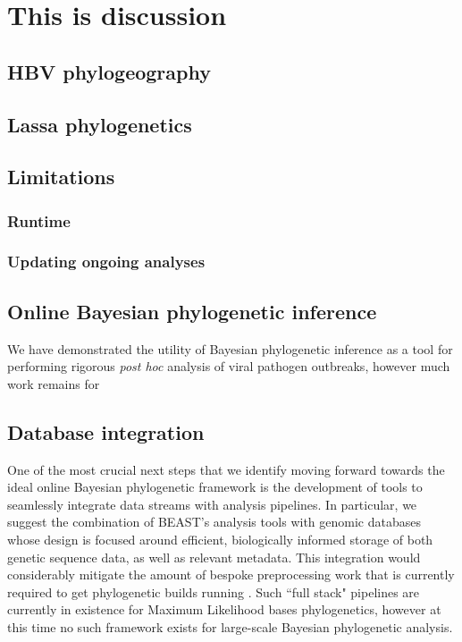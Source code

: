 \chapter{This is discussion}\label{ch:discussion}

\section{HBV phylogeography}

\section{Lassa phylogenetics}

\section{Limitations}

\subsection{Runtime}

\subsection{Updating ongoing analyses}

\section{Online Bayesian phylogenetic inference}

We have demonstrated the utility of Bayesian phylogenetic inference as a tool for performing rigorous \textit{post hoc} analysis of viral pathogen outbreaks, however much work remains for

\section{Database integration}

One of the most crucial next steps that we identify moving forward towards the ideal online Bayesian phylogenetic framework is the development of tools to seamlessly integrate data streams with analysis pipelines.
In particular, we suggest the combination of BEAST's analysis tools with genomic databases whose design is focused around efficient, biologically informed storage of both genetic sequence data, as well as relevant metadata.
This integration would considerably mitigate the amount of bespoke preprocessing work that is currently required to get phylogenetic builds running .
Such ``full stack" pipelines are currently in existence for Maximum Likelihood bases phylogenetics\cite{nextstrain}, however at this time no such framework exists for large-scale Bayesian phylogenetic analysis.

